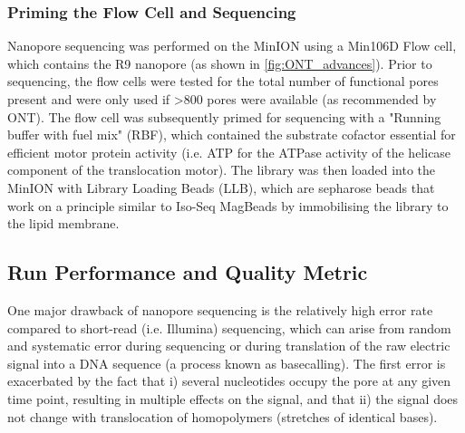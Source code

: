 \subsubsection{Priming the Flow Cell and Sequencing}
\label{sec: ONTlib_sequencing}
Nanopore sequencing was performed on the MinION using a Min106D Flow cell, which contains the R9 nanopore (as shown in \cref{fig:ONT_advances}). Prior to sequencing, the flow cells were tested for the total number of functional pores present and were only used if >800 pores were available (as recommended by ONT). The flow cell was subsequently primed for sequencing with a "Running buffer with fuel mix" (RBF), which contained the substrate cofactor essential for efficient motor protein activity (i.e. ATP for the ATPase activity of the helicase component of the translocation motor). The library was then loaded into the MinION with Library Loading Beads (LLB), which are sepharose beads that work on a principle similar to Iso-Seq MagBeads by immobilising the library to the lipid membrane.

\subsection{Run Performance and Quality Metric}
\label{ONT_performance}
One major drawback of nanopore sequencing is the relatively high error rate compared to short-read (i.e. Illumina) sequencing, which can arise from random and systematic error during sequencing or during translation of the raw electric signal into a DNA sequence (a process known as basecalling)\cite{Rang2018}. The first error is exacerbated by the fact that i) several nucleotides occupy the pore at any given time point, resulting in multiple effects on the signal, and that ii) the signal does not change with translocation of homopolymers (stretches of identical bases).

